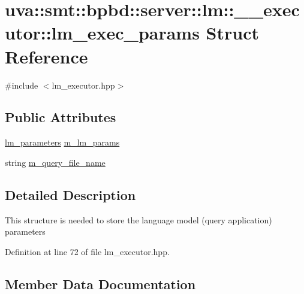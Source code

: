 \hypertarget{structuva_1_1smt_1_1bpbd_1_1server_1_1lm_1_1____executor_1_1lm__exec__params}{}\section{uva\+:\+:smt\+:\+:bpbd\+:\+:server\+:\+:lm\+:\+:\+\_\+\+\_\+executor\+:\+:lm\+\_\+exec\+\_\+params Struct Reference}
\label{structuva_1_1smt_1_1bpbd_1_1server_1_1lm_1_1____executor_1_1lm__exec__params}


{\ttfamily \#include $<$lm\+\_\+executor.\+hpp$>$}

\subsection*{Public Attributes}
\begin{DoxyCompactItemize}
\item 
\hyperlink{structuva_1_1smt_1_1bpbd_1_1server_1_1lm_1_1lm__parameters}{lm\+\_\+parameters} \hyperlink{structuva_1_1smt_1_1bpbd_1_1server_1_1lm_1_1____executor_1_1lm__exec__params_a0389806054816e5c22e503a3822d3d99}{m\+\_\+lm\+\_\+params}
\item 
string \hyperlink{structuva_1_1smt_1_1bpbd_1_1server_1_1lm_1_1____executor_1_1lm__exec__params_add893637044e50b058543f943b79c785}{m\+\_\+query\+\_\+file\+\_\+name}
\end{DoxyCompactItemize}


\subsection{Detailed Description}
This structure is needed to store the language model (query application) parameters 

Definition at line 72 of file lm\+\_\+executor.\+hpp.



\subsection{Member Data Documentation}
\hypertarget{structuva_1_1smt_1_1bpbd_1_1server_1_1lm_1_1____executor_1_1lm__exec__params_a0389806054816e5c22e503a3822d3d99}{}
